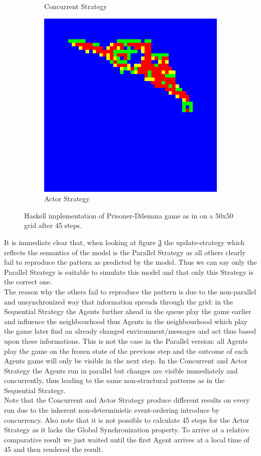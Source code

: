 \begin{figure}
\begin{subfigure}[b]{0.475\textwidth}
            \caption[]%
            {{\small Concurrent Strategy}}    
            \label{fig:con_strat}
        \end{subfigure}
        \quad
        \begin{subfigure}[b]{0.475\textwidth}   
            \centering 
            \includegraphics[width=.4\textwidth, angle=0]{./fig/act_50x50_45steps_MSG_haskell.png}
            \caption[]%
            {{\small Actor Strategy}}    
            \label{fig:act_strat}
        \end{subfigure}
        \caption[]
        {\small Haskell implementation of Prisoner-Dilemma game as in \cite{huberman_evolutionary_1993} on a 50x50 grid after 45 steps.} 
        \label{fig:prisoner_strategies}
    \end{figure}
    
It is immediate clear that, when looking at figure \ref{fig:prisoner_strategies} the update-strategy which reflects the semantics of the model is the Parallel Strategy as all others clearly fail to reproduce the pattern as predicted by the model. Thus we can say only the Parallel Strategy is suitable to simulate this model and that only this Strategy is the correct one. \\
The reason why the others fail to reproduce the pattern is due to the non-parallel and unsynchronized way that information spreads through the grid: in the Sequential Strategy the Agents further ahead in the queue play the game earlier and influence the neighbourhood thus Agents in the neighbourhood which play the game later find an already changed environment/messages and act thus based upon these informations. This is not the case in the Parallel version: all Agents play the game on the frozen state of the previous step and the outcome of each Agents game will only be visible in the next step. In the Concurrent and Actor Strategy the Agents run in parallel but changes are visible immediately and concurrently, thus leading to the same non-structural patterns as in the Sequential Strategy. \\
Note that the Concurrent and Actor Strategy produce different results on every run due to the inherent non-deterministic event-ordering introduce by concurrency. Also note that it is not possible to calculate 45 steps for the Actor Strategy as it lacks the Global Synchronization property. To arrive at a relative comparative result we just waited until the first Agent arrives at a local time of 45 and then rendered the result. 